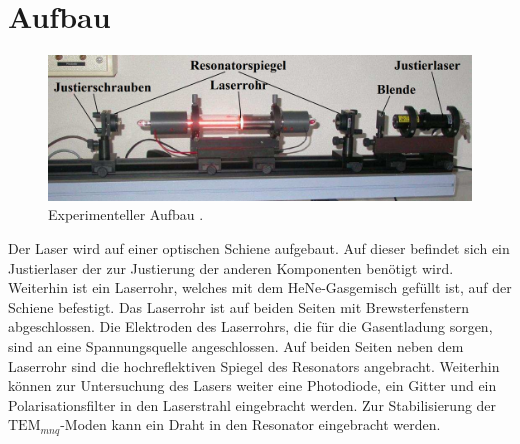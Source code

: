 \section{Aufbau}
\label{sec:Aufbau}
\begin{figure}
	\centering
	\includegraphics[width=\linewidth-100pt,height=\textheight-100pt,keepaspectratio]{content/Images/aufbau.png}
	\caption{Experimenteller Aufbau \cite{V61}.}
	\label{fig:Aufbau}
\end{figure}

Der Laser wird auf einer optischen Schiene aufgebaut. Auf dieser befindet sich ein Justierlaser der zur Justierung der anderen Komponenten benötigt wird. Weiterhin ist ein Laserrohr, welches mit dem HeNe-Gasgemisch gefüllt ist, auf der Schiene befestigt. Das Laserrohr ist auf beiden Seiten mit Brewsterfenstern abgeschlossen. Die Elektroden des Laserrohrs, die für die Gasentladung sorgen, sind an eine Spannungsquelle angeschlossen. Auf beiden Seiten neben dem Laserrohr sind die hochreflektiven Spiegel des Resonators angebracht. Weiterhin können zur Untersuchung des Lasers weiter eine Photodiode, ein Gitter und ein Polarisationsfilter in den Laserstrahl eingebracht werden. Zur Stabilisierung der  $\text{TEM}_{mnq}$-Moden kann ein Draht in den Resonator eingebracht werden.